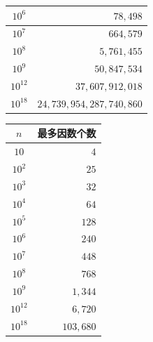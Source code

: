 \begin{center}
\begin{minipage}[t]{.3\linewidth}
\begin{tabular}{|c|r|}
            \hline
            $10^6$ & $78,498$ \\
            \hline
            $10^7$ & $664,579$ \\
            \hline
            $10^8$ & $5,761,455$ \\
            \hline
            $10^9$ & $50,847,534$ \\
            \hline
            $10^{12}$ & $37,607,912,018$ \\
            \hline
            $10^{18}$ & $24,739,954,287,740,860$ \\
            \hline
        \end{tabular}
        \par \vspace{1cm}
        \begin{tabular}{|c|r|}
            \hline
            $n$ & 最多因数个数 \\
            \hline
            $10$ & $4$ \\
            \hline
            $10^2$ & $25$ \\
            \hline
            $10^3$ & $32$ \\
            \hline
            $10^4$ & $64$ \\
            \hline
            $10^5$ & $128$ \\
            \hline
            $10^6$ & $240$ \\
            \hline
            $10^7$ & $448$ \\
            \hline
            $10^8$ & $768$ \\
            \hline
            $10^9$ & $1,344$ \\
            \hline
            $10^{12}$ & $6,720$ \\
            \hline
            $10^{18}$ & $103,680$ \\
            \hline
        \end{tabular}
    \end{minipage}
\end{center}


\newpage
